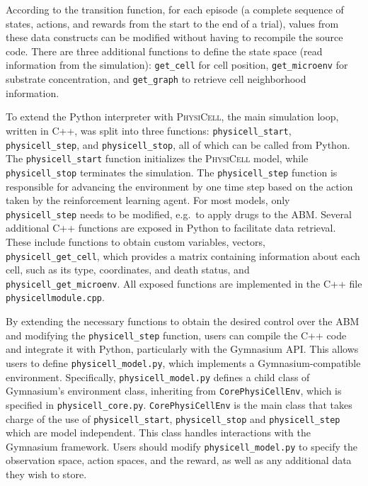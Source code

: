 \documentclass{article}
\newcommand{\physicell}{\textsc{PhysiCell}}
\begin{document}
According to the transition function, for each episode (a complete sequence of
states, actions, and rewards from the start to the end of a trial), values from
these data constructs can be modified without having to recompile the source
code. There are three additional functions to define the state space (read
information from the simulation): \texttt{get\_cell} for cell position,
\texttt{get\_microenv} for substrate concentration, and \texttt{get\_graph} to
retrieve cell neighborhood information.

To extend the Python interpreter with \physicell{}, the main simulation loop,
written in C++, was split into three functions: \texttt{physicell\_start},
\texttt{physicell\_step}, and \texttt{physicell\_stop}, all of which can be
called from Python. The \texttt{physicell\_start} function initializes the
\physicell{} model, while \texttt{physicell\_stop} terminates the simulation.
The \texttt{physicell\_step} function is responsible for advancing the
environment by one time step based on the action taken by the reinforcement
learning agent. For most models, only \texttt{physicell\_step} needs to be
modified, e.g.\ to apply drugs to the ABM. Several additional C++ functions are
exposed in Python to facilitate data retrieval. These include functions to
obtain custom variables, vectors, \texttt{physicell\_get\_cell}, which provides
a matrix containing information about each cell, such as its type, coordinates,
and death status, and \texttt{physicell\_get\_microenv}. All exposed functions
are implemented in the C++ file \texttt{physicellmodule.cpp}.

By extending the necessary functions to obtain the desired control over the ABM
and modifying the \texttt{physicell\_step} function, users can compile the C++
code and integrate it with Python, particularly with the Gymnasium API. This
allows users to define \texttt{physicell\_model.py}, which implements a
Gymnasium-compatible environment. Specifically, \texttt{physicell\_model.py}
defines a child class of Gymnasium's environment class, inheriting from
\texttt{CorePhysiCellEnv}, which is specified in \texttt{physicell\_core.py}.
\texttt{CorePhysiCellEnv} is the main class that takes charge of the use of
\texttt{physicell\_start}, \texttt{physicell\_stop} and \texttt{physicell\_step}
which are model independent. This class handles interactions with the Gymnasium
framework. Users should modify \texttt{physicell\_model.py} to specify the
observation space, action spaces, and the reward, as well as any additional data
they wish to store.
\end{document}
